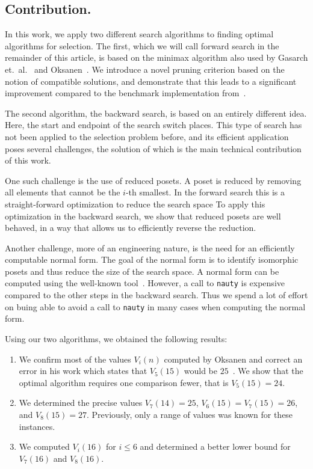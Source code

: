 \documentclass[a4paper,UKenglish,cleveref, autoref, thm-restate]{lipics-v2021}
\begin{document}
\subsection{Contribution.}
In this work, we apply two different search algorithms to finding optimal algorithms for selection.
The first, which we will call forward search in the remainder of this article, is based on the minimax algorithm also used by Gasarch et.\ al\@.~\cite{Gasarch1996} and Oksanen~\cite{Oksanen,Oksanen2006}.
We introduce a novel pruning criterion based on the notion of compatible solutions, and demonstrate that this leads to a significant improvement compared to the benchmark implementation from~\cite{Oksanen}.

The second algorithm, the backward search, is based on an entirely different idea.
Here, the start and endpoint of the search switch places.
This type of search has not been applied to the selection problem before, and its efficient application poses several challenges, the solution of which is the main technical contribution of this work.

One such challenge is the use of reduced posets.
A poset is reduced by removing all elements that cannot be the $i$-th smallest.
In the forward search this is a straight-forward optimization to reduce the search space
To apply this optimization in the backward search, we show that reduced posets are well behaved, in a way that allows us to efficiently reverse the reduction.

Another challenge, more of an engineering nature, is the need for an efficiently computable normal form.
The goal of the normal form is to identify isomorphic posets and thus reduce the size of the search space.
A normal form can be computed using the well-known  tool~\cite{MCKAY201494}.
However, a call to \texttt{nauty} is expensive compared to the other steps in the backward search.
Thus we spend a lot of effort on buing able to avoid a call to \texttt{nauty} in many cases when computing the normal form.

Using our two algorithms, we obtained the following results:
\begin{enumerate}
  \item We confirm most of the values $V_i(n)$ computed by Oksanen and correct an error in his work which states that $V_5(15)$ would be $25$~\cite{Oksanen}.
        We show that the optimal algorithm requires one comparison fewer, that is $V_5(15) = 24$.
  \item We determined the precise values $V_7(14) = 25$, $V_6(15) = V_7(15) = 26$, and $V_8(15) = 27$.
        Previously, only a range of values was known for these instances.
  \item We computed $V_i(16)$ for $i \leq 6$ and determined a better lower bound for $V_7(16)$ and $V_8(16)$.
\end{enumerate}
\end{document}
